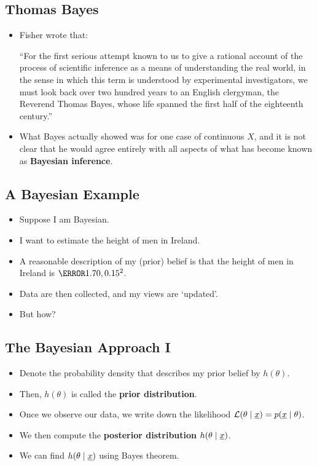 \subsection*{Thomas Bayes}
\begin{itemize}
      \item Fisher wrote that:

            ``For the first serious attempt known to us to give a rational
            account of the process of scientific inference as a means of
            understanding the real world, in the sense in which this term is
            understood by experimental investigators, we must look back over
            two hundred years to an English clergyman, the Reverend Thomas
            Bayes, whose life spanned the first half of the eighteenth century.''
      \item What Bayes actually showed was for one case of continuous $X$, and it is
            not clear that he would agree entirely with all aspects of what has
            become known as \textbf{Bayesian inference}.
\end{itemize}
\subsection*{A Bayesian Example}
\begin{itemize}
      \item Suppose I am Bayesian.
      \item I want to estimate the height of men in Ireland.
      \item A reasonable description of my (prior) belief is that the height of men in
            Ireland is $ \N{1.70,0.15^2} $.
      \item Data are then collected, and my views are `updated'.
      \item But how?
\end{itemize}
\subsection*{The Bayesian Approach I}
\begin{itemize}
      \item Denote the probability density that describes my prior belief by $ h(\theta) $.
      \item Then, $ h(\theta) $ is called the \textbf{prior distribution}.
      \item Once we observe our data, we write down the likelihood
            $ \mathcal{L}(\theta\mid \underline{x})=p(\underline{x}\mid \theta) $.
      \item We then compute the \textbf{posterior distribution} $ h(\theta\mid \underline{x}) $.
      \item We can find $ h(\theta\mid \underline{x}) $ using Bayes theorem.
\end{itemize}
